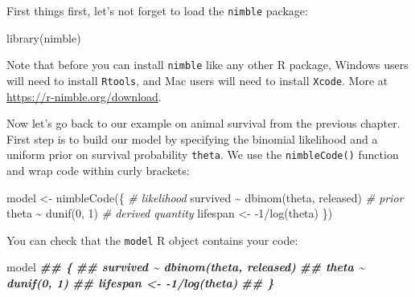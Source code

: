 \documentclass[
  12pt,
]{krantz}
\newenvironment{Shaded}{\begin{snugshade}}{\end{snugshade}}
\newcommand{\CommentTok}[1]{\textcolor[rgb]{0.56,0.35,0.01}{\textit{#1}}}
\newcommand{\DecValTok}[1]{\textcolor[rgb]{0.00,0.00,0.81}{#1}}
\newcommand{\DocumentationTok}[1]{\textcolor[rgb]{0.56,0.35,0.01}{\textbf{\textit{#1}}}}
\newcommand{\FunctionTok}[1]{\textcolor[rgb]{0.00,0.00,0.00}{#1}}
\newcommand{\NormalTok}[1]{#1}
\newcommand{\OtherTok}[1]{\textcolor[rgb]{0.56,0.35,0.01}{#1}}
\newcommand{\SpecialCharTok}[1]{\textcolor[rgb]{0.00,0.00,0.00}{#1}}
\begin{document}
First things first, let's not forget to load the \texttt{nimble} package:

\begin{Shaded}
\begin{Highlighting}[]
\FunctionTok{library}\NormalTok{(nimble)}
\end{Highlighting}
\end{Shaded}

Note that before you can install \texttt{nimble} like any other R package, Windows users will need to install \texttt{Rtools}, and Mac users will need to install \texttt{Xcode}. More at \url{https://r-nimble.org/download}.

Now let's go back to our example on animal survival from the previous chapter. First step is to build our model by specifying the binomial likelihood and a uniform prior on survival probability \texttt{theta}. We use the \texttt{nimbleCode()} function and wrap code within curly brackets:

\begin{Shaded}
\begin{Highlighting}[]
\NormalTok{model }\OtherTok{\textless{}{-}} \FunctionTok{nimbleCode}\NormalTok{(\{}
  \CommentTok{\# likelihood}
\NormalTok{  survived }\SpecialCharTok{\textasciitilde{}} \FunctionTok{dbinom}\NormalTok{(theta, released)}
  \CommentTok{\# prior}
\NormalTok{  theta }\SpecialCharTok{\textasciitilde{}} \FunctionTok{dunif}\NormalTok{(}\DecValTok{0}\NormalTok{, }\DecValTok{1}\NormalTok{)}
  \CommentTok{\# derived quantity}
\NormalTok{  lifespan }\OtherTok{\textless{}{-}} \SpecialCharTok{{-}}\DecValTok{1}\SpecialCharTok{/}\FunctionTok{log}\NormalTok{(theta)}
\NormalTok{\})}
\end{Highlighting}
\end{Shaded}

You can check that the \texttt{model} R object contains your code:

\begin{Shaded}
\begin{Highlighting}[]
\NormalTok{model}
\DocumentationTok{\#\# \{}
\DocumentationTok{\#\#     survived \textasciitilde{} dbinom(theta, released)}
\DocumentationTok{\#\#     theta \textasciitilde{} dunif(0, 1)}
\DocumentationTok{\#\#     lifespan \textless{}{-} {-}1/log(theta)}
\DocumentationTok{\#\# \}}
\end{Highlighting}
\end{Shaded}
\end{document}

